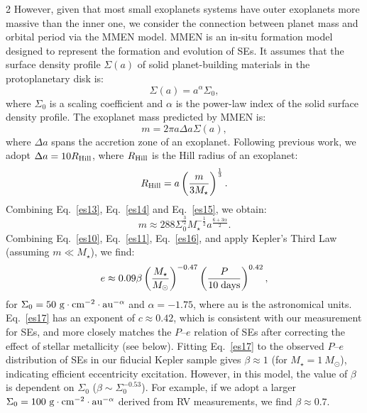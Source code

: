 \documentclass[10pt]{article}
\begin{document}
\begin{multicols}{2}
However, given that most small exoplanets systems have outer exoplanets more massive than the inner one\cite{2013ApJ...763...41C,2022MNRAS.514.3844C}, we consider the connection between planet mass and orbital period via the MMEN model\cite{2004ApJ...612.1147K,2013MNRAS.431.3444C,2020AJ....159..247D}.
MMEN is an in-situ formation model designed to represent the formation and evolution of SEs.
It assumes that the surface density profile $\Sigma(a)$ of solid planet-building materials in the protoplanetary disk is:
\begin{equation}
\label{es13}
\Sigma(a) = a^\alpha \Sigma_0,
\end{equation}
where $\Sigma_0$ is a scaling coefficient and $\alpha$ is the power-law index of the solid surface density profile.
The exoplanet mass predicted by MMEN is:
\begin{equation}
\label{es14}
m = 2\pi a \Delta a \Sigma(a),
\end{equation}
where $\Delta a$ spans the accretion zone of an exoplanet.
Following previous work\cite{1998Icar..131..171K,2020AJ....159..247D}, we adopt $\Delta a=10R_{\rm Hill}$, where $R_{\rm Hill}$ is the Hill radius of an exoplanet:
\begin{equation}
\label{es15}
R_{\rm Hill} =a \left(\frac{m}{3M_\star}\right)^{\frac{1}{3}}.
\end{equation}
Combining Eq.~\ref{es13}, Eq.~\ref{es14} and Eq.~\ref{es15}, we obtain:
\begin{equation}
\label{es16}
m \approx 288\Sigma_0^{\frac{3}{2}} M_\star^{-\frac{1}{2}} a^{\frac{6+3\alpha}{2}}.
\end{equation}
Combining Eq.~\ref{es10}, Eq.~\ref{es11}, Eq.~\ref{es16}, and apply Kepler's Third Law (assuming $m \ll M_{\star}$), we find:
\begin{equation}
\label{es17}
e \approx 0.09\beta \left(\frac{M_{\star}}{M_\odot}\right)^{-0.47} \left({\frac{P}{10\;{\rm days}}}\right)^{0.42},
\end{equation}
for $\Sigma_0=50~{\rm g \cdot cm^{-2}}\cdot{\rm au}^{-\alpha}$ and $\alpha=-1.75$\cite{2020AJ....159..247D}, where au is the astronomical units.
Eq.~\ref{es17} has an exponent of $c\approx0.42$, which is consistent with our measurement for SEs, and more closely matches the $P$--$e$ relation of SEs after correcting the effect of stellar metallicity (see below).
Fitting Eq.~\ref{es17} to the observed $P$--$e$ distribution of SEs in our fiducial Kepler sample gives $\beta \approx 1$ (for $M_{\star}=1~M_\odot$), indicating efficient eccentricity excitation.
However, in this model, the value of $\beta$ is dependent on $\Sigma_0$ ($\beta \sim \Sigma_0 ^{-0.53}$).
For example, if we adopt a larger $\Sigma_0=100~{\rm g \cdot cm^{-2}}\cdot{\rm au}^{-\alpha}$ derived from RV measurements\cite{2020AJ....159..247D}, we find $\beta \approx 0.7$.


\end{multicols}
\end{document}
